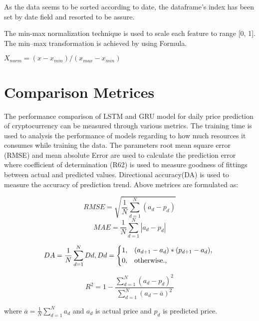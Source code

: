 As the data seems to be sorted according to date, the dataframe's index has been set by date field and resorted to be assure.

The min-max normalization technique is used to scale each feature to range [0, 1]. The min–max transformation is achieved by using Formula.

\begin{center}
$X_{norm} = (x - x_{min})/(x_{max}-x_{min})$
\end{center}

\section{Comparison Metrices}
The performance comparison of LSTM and GRU model for daily price prediction of cryptocurrency can be measured through various metrics. The training time is used to analysis the performance of models regarding to how much resources it consumes while training the data. The parameters root mean square error (RMSE) and mean absolute Error are used to calculate the prediction error where coefficient of determination (R$62$) is used to measure goodness of fittings between actual and predicted values. Directional accuracy(DA) is used to measure the accuracy of prediction trend. Above metrices are formulated as:

\begin{equation}
		RMSE = \sqrt{\frac{1}{N}\sum_{d=1}^{N}(a_d - p_d)}
\end{equation} 
\begin{equation}
	MAE = \frac{1}{N}\sum_{d=1}^{N}{|a_d - p_d|}
\end{equation} 

\begin{equation}
	DA = \frac{1}{N}\sum_{d=1}^{N}{Dd}, 
	Dd = \begin{cases*}
		1, & ($a_{d+1}- a_d)* (p_{d+1}-a_d)$, \\
		0, & otherwise., \\
	\end{cases*}
\end{equation}

\begin{equation}
	R^2 = 1 - \frac{\sum_{d=1}^{N}(a_d-p_d)^2}{\sum_{d=1}^{N}(a_d - \overline{a})^2}
\end{equation}	

where $\overline{a} = \frac{1}{N}\sum_{d=1}^{N} a_d$ and $a_d$ is actual price and $p_d$ is predicted price.